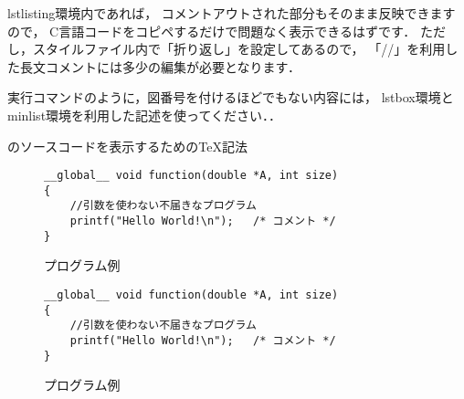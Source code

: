 lstlisting環境内であれば，
コメントアウトされた部分もそのまま反映できますので，
C言語コードをコピペするだけで問題なく表示できるはずです．
ただし，スタイルファイル内で「折り返し」を設定してあるので，
「//」を利用した長文コメントには多少の編集が必要となります．

実行コマンドのように，図番号を付けるほどでもない内容には，
lstbox環境とminlist環境を利用した記述を使ってください．．
\begin{lstbox}{のソースコードを表示するためのTeX記法}
\begin{minilst}
\begin{figure}[ht] %
\begin{lstlisting}
__global__ void function(double *A, int size)
{
	//引数を使わない不届きなプログラム
	printf("Hello World!\n");	/* コメント */
}	
\end{lstlisting}
\caption{プログラム例}
\label{fig:hello}
\end{figure} %
\end{minilst}
\end{lstbox}
\begin{figure}[ht] 
\begin{lstlisting}
__global__ void function(double *A, int size)
{
	//引数を使わない不届きなプログラム 
	printf("Hello World!\n");	/* コメント */
}
\end{lstlisting}
\caption{プログラム例}
\label{fig:hello}
\end{figure} 
